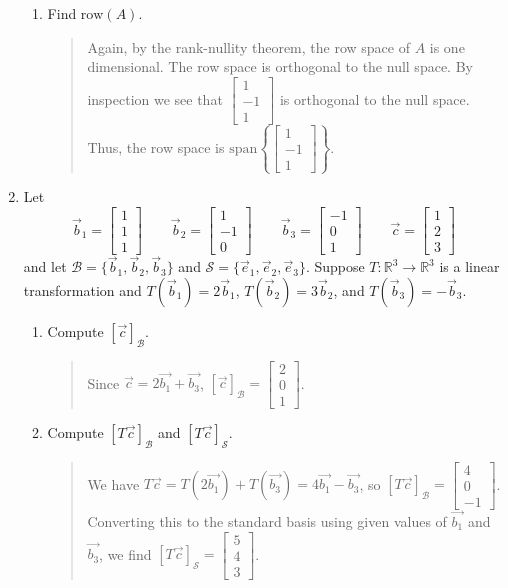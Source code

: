\documentclass[letter]{article}
\newcommand{\R}{\mathbb{R}}
\newcommand{\Span}{\mathrm{span}}
\newcommand{\mat}[1]{\begin{bmatrix}#1\end{bmatrix}}
\begin{document}
\begin{enumerate}
\begin{enumerate}
				\item Find $\text{row}(A)$.
				\begin{quote}
					Again, by the rank-nullity theorem, the row space of $A$ is one dimensional.  The
					row space is orthogonal to the null space.  By inspection we see that
					$\mat{1\\-1\\1}$ is orthogonal to the null space.  Thus, the row space is $\Span\left\{\mat{1\\-1\\1}\right\}$.
				\end{quote}

			\end{enumerate}
		
		\item Let
			\[
				\vec b_1=\mat{1\\1\\1}\qquad\vec b_2=\mat{1\\-1\\0}\qquad
				\vec b_3=\mat{-1\\0\\1}\qquad \vec c=\mat{1\\2\\3}
			\]
			and let $\mathcal B=\{\vec b_1,\vec b_2,\vec b_3\}$ and $\mathcal S=\{\vec e_1,\vec e_2,\vec e_3\}$.
			Suppose $T:\R^3\to\R^3$ is a linear transformation and $T(\vec b_1)=2\vec b_1$, 
			$T(\vec b_2)=3\vec b_2$, and $T(\vec b_3)=-\vec b_3$.
			\begin{enumerate}
				\item Compute $[\vec c]_{\mathcal B}$.
				\begin{quote}
					Since $\vec{c} = 2 \vec{b_1} + \vec{b_3}$, $[\vec c]_{\mathcal B} = \mat{2\\0\\1}$.
				\end{quote}

				\item Compute $[T\vec c]_{\mathcal B}$ and $[T\vec c]_{\mathcal S}$.
				\begin{quote}
					We have $T \vec{c} = T(2 \vec{b_1}) + T(\vec{b_3}) = 4 \vec{b_1} - \vec{b_3}$, so $[T\vec c]_{\mathcal B} = \mat{4\\0\\-1}$.  Converting this to the standard basis using given values of $\vec{b_1}$ and $\vec{b_3}$, we find $[T\vec c]_{\mathcal S} = \mat{5\\4\\3}$.
				\end{quote}


\end{enumerate}
\end{enumerate}
\end{document}
